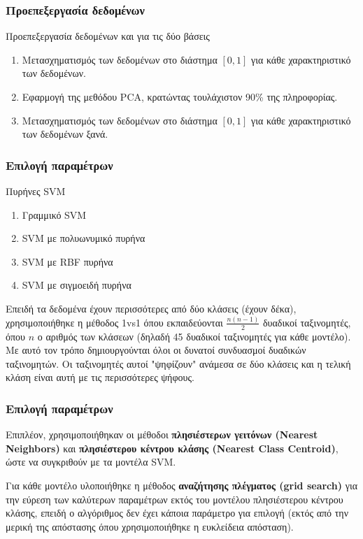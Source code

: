 \documentclass{beamer}
\begin{document}
\begin{frame}
\frametitle{Προεπεξεργασία δεδομένων}

\begin{block}{Προεπεξεργασία δεδομένων και για τις δύο βάσεις}
\begin{enumerate}
    \item Μετασχηματισμός των δεδομένων στο διάστημα $[0,1]$ για κάθε
        χαρακτηριστικό των δεδομένων.
    \item Εφαρμογή της μεθόδου PCA, κρατώντας τουλάχιστον 90\% της πληροφορίας.
    \item Μετασχηματισμός των δεδομένων στο διάστημα $[0,1]$ για κάθε
        χαρακτηριστικό των δεδομένων ξανά.
\end{enumerate}
\end{block}

\end{frame}

\begin{frame}
\frametitle{Επιλογή παραμέτρων}

\begin{block}{Πυρήνες SVM}
\begin{enumerate}
    \item Γραμμικό SVM
    \item SVM με πολυωνυμικό πυρήνα
    \item SVM με RBF πυρήνα
    \item SVM με σιγμοειδή πυρήνα
\end{enumerate}
\end{block} \pause

Επειδή τα δεδομένα έχουν περισσότερες από δύο κλάσεις (έχουν δέκα),
χρησιμοποιήθηκε η μέθοδος 1vs1 όπου εκπαιδεύονται $\frac{n (n-1)}{2}$ δυαδικοί
ταξινομητές, όπου $n$ ο αριθμός των κλάσεων (δηλαδή 45 δυαδικοί ταξινομητές για
κάθε μοντέλο). Με αυτό τον τρόπο δημιουργούνται όλοι οι δυνατοί συνδυασμοί
δυαδικών ταξινομητών. Οι ταξινομητές αυτοί "ψηφίζουν" ανάμεσα σε δύο κλάσεις
και η τελική κλάση είναι αυτή με τις περισσότερες ψήφους.

\end{frame}

\begin{frame}
\frametitle{Επιλογή παραμέτρων}

Επιπλέον, χρησιμοποιήθηκαν οι μέθοδοι \textbf{πλησιέστερων γειτόνων (Nearest
Neighbors)} και \textbf{πλησιέστερου κέντρου κλάσης (Nearest Class Centroid)},
ώστε να συγκριθούν με τα μοντέλα SVM.


Για κάθε μοντέλο υλοποιήθηκε η μέθοδος \textbf{αναζήτησης πλέγματος (grid
search)} για την εύρεση των καλύτερων παραμέτρων εκτός του μοντέλου πλησιέστερου
κέντρου κλάσης, επειδή ο αλγόριθμος δεν έχει κάποια παράμετρο για επιλογή (εκτός
από την μερική της απόστασης όπου χρησιμοποιήθηκε η ευκλείδεια απόσταση).

\end{frame}
\end{document}
